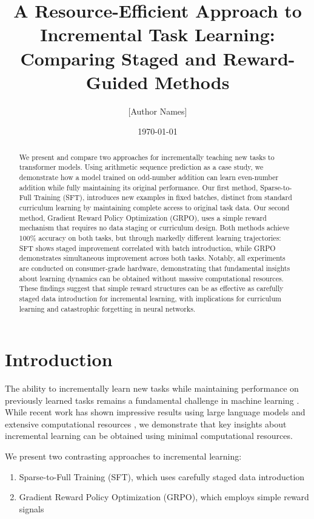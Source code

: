 \documentclass[11pt]{article}
\title{A Resource-Efficient Approach to Incremental Task Learning: \\ Comparing Staged and Reward-Guided Methods}
\author{[Author Names]}
\date{\today}
\begin{document}
\maketitle

\begin{abstract}
We present and compare two approaches for incrementally teaching new tasks to transformer models. Using arithmetic sequence prediction as a case study, we demonstrate how a model trained on odd-number addition can learn even-number addition while fully maintaining its original performance. Our first method, Sparse-to-Full Training (SFT), introduces new examples in fixed batches, distinct from standard curriculum learning by maintaining complete access to original task data. Our second method, Gradient Reward Policy Optimization (GRPO), uses a simple reward mechanism that requires no data staging or curriculum design. Both methods achieve 100\% accuracy on both tasks, but through markedly different learning trajectories: SFT shows staged improvement correlated with batch introduction, while GRPO demonstrates simultaneous improvement across both tasks. Notably, all experiments are conducted on consumer-grade hardware, demonstrating that fundamental insights about learning dynamics can be obtained without massive computational resources. These findings suggest that simple reward structures can be as effective as carefully staged data introduction for incremental learning, with implications for curriculum learning and catastrophic forgetting in neural networks.
\end{abstract}

\section{Introduction}
The ability to incrementally learn new tasks while maintaining performance on previously learned tasks remains a fundamental challenge in machine learning \cite{kirkpatrick2017}. While recent work has shown impressive results using large language models and extensive computational resources \cite{brown2020}, we demonstrate that key insights about incremental learning can be obtained using minimal computational resources.

We present two contrasting approaches to incremental learning:
\begin{enumerate}
    \item Sparse-to-Full Training (SFT), which uses carefully staged data introduction
    \item Gradient Reward Policy Optimization (GRPO), which employs simple reward signals
\end{enumerate}
\end{document}
